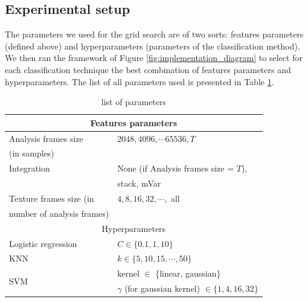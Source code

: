 \documentclass[10pt, conference, compsocconf]{IEEEtran}
\begin{document}
\subsection{Experimental setup}
The parameters we used for the grid search are of two sorts: features parameters (defined above) and hyperparameters (parameters of the classification method). We then ran the framework of Figure \ref{fig:implementation_diagram} to select for each classification technique the best combination of features parameters and hyperparameters. The list of all parameters used is presented in Table \ref{table:params}.

\begin{table}[h]
  \centering
  \begin{tabular}{|l|l|}
    \hline
    \multicolumn{2}{|c|}{Features parameters}                                          \\
      \hline
      Analysis frames size     & $2048, 4096, \cdots 65536, T$                         \\
      (in samples)             &                                                       \\
     \hline
     Integration               & None (if Analysis frames size = $T$),                 \\
                               & stack, mVar                                           \\
    \hline
    Texture frames size (in    & $4,8,16,32, \cdots,$ all                              \\
    number of analysis frames) &                                                       \\
    \hline
    \hline
    \multicolumn{2}{|c|}{Hyperparameters}                                              \\
     \hline
    Logistic regression        & $C \in \{0.1,1,10\}$                                  \\
    \hline
    KNN                        & $k \in \{5,10,15,\cdots,50\}$                         \\ 
    \hline
    \multirow{2}{*}{SVM}
                               & kernel $\in$ \{linear, gaussian\}                     \\
                               & $\gamma$ (for gaussian kernel) $\in \{1, 4, 16, 32\}$ \\       
  \hline

  \end{tabular}
\caption{list of parameters \label{table:params}}
\end{table}
\end{document}
